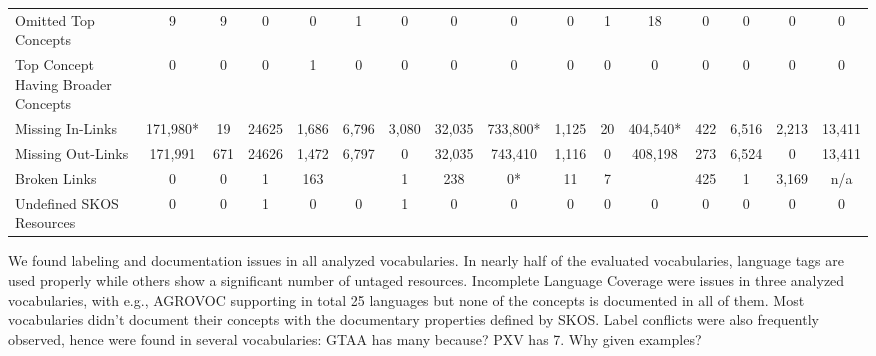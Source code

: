 \begin{table}[h]
\begin{center}
{\begin{tabular}{p{4cm}ccccccccccccccc}
Omitted Top Concepts & 9 & 9 & 0 & 0 & 1 & 0 & 0 & 0 & 0 & 1 & 18 & 0 & 0 & 0 & 0 \\

Top Concept Having Broader Concepts & 0 & 0 & 0 & 1 & 0 &0 & 0 & 0 & 0 & 0 & 0 & 0 & 0 & 0 & 0 \\

\midrule

Missing In-Links & 171,980* & 19 & 24625 & 1,686 & 6,796 & 3,080 & 32,035 & 733,800* & 1,125 & 20 & 404,540* & 422 & 6,516 & 2,213 & 13,411 \\

Missing Out-Links & 171,991 & 671 & 24626 & 1,472 & 6,797 & 0 & 32,035 & 743,410 & 1,116 & 0 & 408,198 & 273 & 6,524 & 0 & 13,411 \\

Broken Links & 0 & 0 & 1 & 163 && 1 & 238 & 0* & 11 & 7 && 425 & 1 & 3,169 & n/a \\


Undefined SKOS Resources & 0 & 0 & 1 & 0 & 0 & 1 & 0 & 0 & 0 & 0 & 0 & 0 & 0 & 0 & 0  \\

\bottomrule
\end{tabular}
}
\end{center}
\end{table}

We found labeling and documentation issues in all analyzed vocabularies. In nearly half of the evaluated vocabularies, language tags are used properly while others show a significant number of untaged resources. Incomplete Language Coverage were issues in three analyzed vocabularies, with e.g., AGROVOC supporting in total 25 languages but none of the concepts is documented in all of them. Most vocabularies didn't document their concepts with the documentary properties defined by SKOS. Label conflicts were also frequently observed, hence  were found in several vocabularies: GTAA has many because? PXV has 7. Why given examples?



